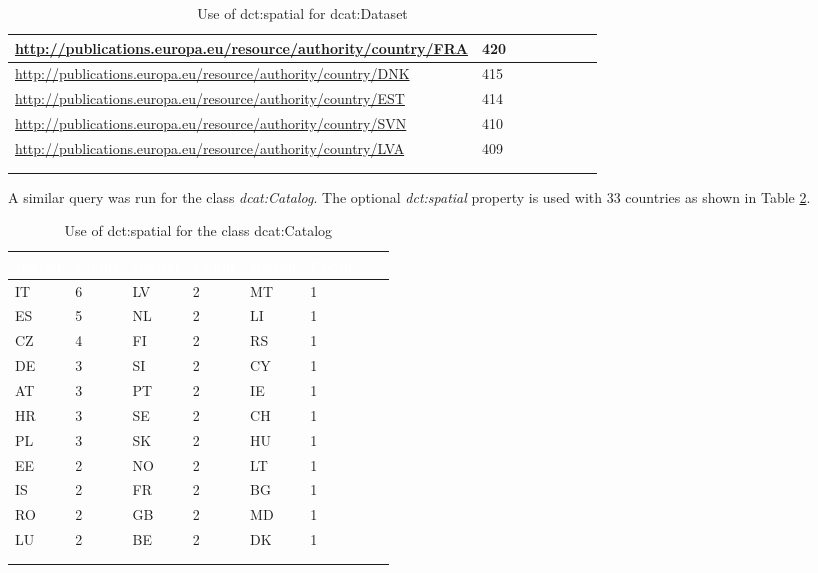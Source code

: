 \documentclass[<options>]{elsarticle}
\begin{document}
\begin{longtable}{*8l}
\rowcolor{gray!10} \url{http://publications.europa.eu/resource/authority/country/FRA  } &420\\ \hline
\rowcolor{gray!10} \url{http://publications.europa.eu/resource/authority/country/DNK } &415\\ \hline
\rowcolor{gray!10} \url{http://publications.europa.eu/resource/authority/country/EST 	} &414\\ \hline
\rowcolor{gray!10} \url{http://publications.europa.eu/resource/authority/country/SVN } &410\\ \hline
\rowcolor{gray!10} \url{http://publications.europa.eu/resource/authority/country/LVA } &409\\ \hline
\\ 
\caption{Use of dct:spatial for dcat:Dataset}\label{dct:spatialDatasetTable}
\end{longtable}

A similar query was run for the class \textit{dcat:Catalog}. The optional \textit{dct:spatial} property is used with 33 countries as shown in Table \ref{dct:spatialCatalogTable}.

\begin{longtable}{*8l}
\rowcolor{blue!90}
\textcolor{white}{\textbf{spatial}} & \textcolor{white}{\textbf{Count}} & \textcolor{white}{\textbf{spatial}} & \textcolor{white}{\textbf{Count}} & \textcolor{white}{\textbf{spatial}} & \textcolor{white}{\textbf{Count}} \\ \hline
\rowcolor{gray!10} IT &6 &LV &2 &MT &1 \\ \hline
\rowcolor{gray!10} ES &5 &NL &2 &LI &1 \\ \hline
\rowcolor{gray!10} CZ &4 &FI &2 &RS &1 \\ \hline
\rowcolor{gray!10} DE &3 &SI &2 &CY &1 \\ \hline
\rowcolor{gray!10} AT &3 &PT &2 &IE &1 \\ \hline
\rowcolor{gray!10} HR &3 &SE &2 &CH &1 \\ \hline
\rowcolor{gray!10} PL &3 &SK &2 &HU &1 \\ \hline
\rowcolor{gray!10} EE &2 &NO &2 &LT &1 \\ \hline
\rowcolor{gray!10} IS &2 &FR &2 &BG &1 \\ \hline
\rowcolor{gray!10} RO &2 &GB &2 &MD &1 \\ \hline
\rowcolor{gray!10} LU &2 &BE &2 &DK &1 \\ \hline
\\ 
\caption{Use of dct:spatial for the class dcat:Catalog}\label{dct:spatialCatalogTable}
\end{longtable}
\end{document}
